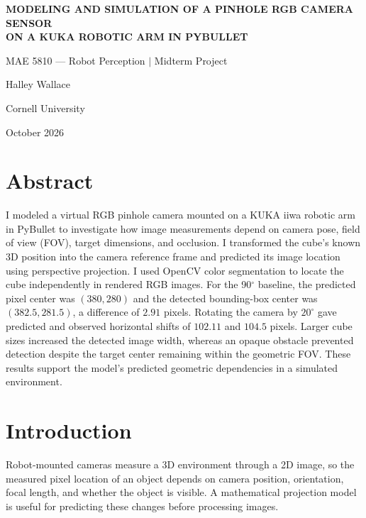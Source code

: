 \documentclass[11pt,letterpaper]{article}
\begin{document}
\begin{titlepage}
\centering
\vspace*{1.45in}
{\Large\bfseries MODELING AND SIMULATION OF A PINHOLE RGB CAMERA SENSOR\\[5pt]
ON A KUKA ROBOTIC ARM IN PYBULLET\par}
\vspace{0.42in}
{\normalsize MAE 5810 --- Robot Perception $\vert$ Midterm Project\par}
\vspace{0.72in}
{\normalsize Halley Wallace\par}
\vspace{0.20in}
{\normalsize Cornell University\par}
\vspace{0.20in}
{\normalsize October 2026\par}
\end{titlepage}

\section*{Abstract}
I modeled a virtual RGB pinhole camera mounted on a KUKA iiwa robotic arm in PyBullet to investigate how image measurements depend on camera pose, field of view (FOV), target dimensions, and occlusion. I transformed the cube's known 3D position into the camera reference frame and predicted its image location using perspective projection. I used OpenCV color segmentation to locate the cube independently in rendered RGB images. For the 90$^\circ$ baseline, the predicted pixel center was $(380,280)$ and the detected bounding-box center was $(382.5,281.5)$, a difference of $2.91$ pixels. Rotating the camera by $20^\circ$ gave predicted and observed horizontal shifts of $102.11$ and $104.5$ pixels. Larger cube sizes increased the detected image width, whereas an opaque obstacle prevented detection despite the target center remaining within the geometric FOV. These results support the model's predicted geometric dependencies in a simulated environment.

\section{Introduction}
Robot-mounted cameras measure a 3D environment through a 2D image, so the measured pixel location of an object depends on camera position, orientation, focal length, and whether the object is visible. A mathematical projection model is useful for predicting these changes before processing images.
\end{document}
